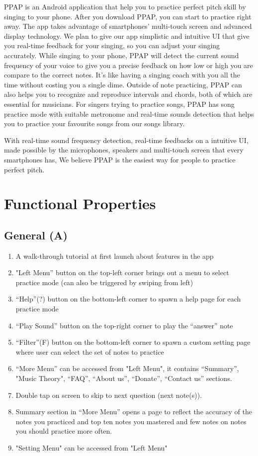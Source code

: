 \documentclass{article}
\begin{document}
PPAP is an Android application that help you to practice perfect pitch skill by singing to your phone. After you download PPAP, you can start to practice right away. The app takes advantage of smartphones’ multi-touch screen and advanced display technology. We plan to give our app simplistic and intuitive UI that give you real-time feedback for your singing, so you can adjust your singing accurately. While singing to your phone, PPAP will detect the current sound frequency of your voice to give you a precise feedback on how low or high you are compare to the correct notes. It’s like having a singing coach with you all the time without costing you a single dime. Outside of note practicing, PPAP can also helps you to recognize and reproduce intervals and chords, both of which are essential for musicians. For singers trying to practice songs, PPAP has song practice mode with suitable metronome and real-time sounds detection that helps you to practice your favourite songs from our songs library.

\qquad

With real-time sound frequency detection, real-time feedbacks on a intuitive UI, made possible by the microphones, speakers and multi-touch screen that every smartphones has, We believe PPAP is the easiest way for people to practice perfect pitch.

\newpage
\section{Functional Properties}
\subsection{General (A)}
\begin{enumerate}
  \item A walk-through tutorial at first launch about features in the app
  \item "Left Menu” button on the top-left corner brings out a menu to select practice mode (can also be triggered by swiping from left)
  \item “Help”(?) button on the bottom-left corner to spawn a help page for each practice mode
  \item “Play Sound” button on the top-right corner to play the “answer” note
  \item “Filter”(F) button on the bottom-left corner to spawn a custom setting page where user can select the set of notes to practice
  \item “More Menu” can be accessed from "Left Menu", it contains “Summary”, "Music Theory", “FAQ”, “About us”, “Donate”, “Contact us” sections.
  \item Double tap on screen to skip to next question (next note(s)).
  \item Summary section in “More Menu” opens a page to reflect the accuracy of the notes you practiced and top ten notes you mastered and few notes on notes you should practice more often. 
  \item "Setting Menu" can be accessed from "Left Menu" 
\end{enumerate}
\end{document}
